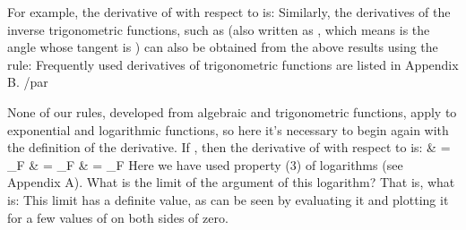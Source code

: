 {{For example, the derivative of \m{\tan\theta}  with respect to \m{\theta}  is:
%
%
Similarly, the derivatives of the inverse trigonometric functions, such as
 (also written as , which means \m{\theta} is
the angle whose tangent is ) can also be obtained from the above results
using the rule:
%
%
Frequently used derivatives of trigonometric functions are listed in
Appendix B.} /par
%
\par{None of our rules, developed from algebraic and trigonometric functions,
apply to exponential and logarithmic functions, so here it's necessary to
begin again with the definition of the derivative.
If , then the derivative of  with respect to  is:
%
           {               & = \lim_{\Delta F}}
           {               & = \lim_{\Delta F}}
           {               & = \lim_{\Delta F}}
%
Here we have used property (3) of logarithms (see Appendix A).
What is the limit of the argument of this logarithm?
%
%
That is, what is:
%
%
This limit has a definite value, as can be seen by evaluating it and
plotting it for a few values of  on both sides of zero.
}}
